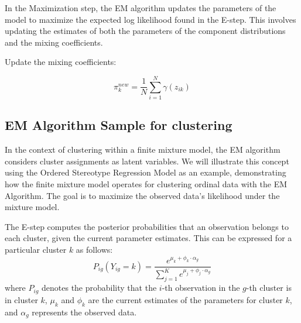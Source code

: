 \documentclass{article}
\begin{document}
In the Maximization step, the EM algorithm updates the parameters of the model to maximize the expected log likelihood found in the E-step. 
This involves updating the estimates of both the parameters of the component distributions and the mixing coefficients.

Update the mixing coefficients:

\begin{equation}
\pi_k^{new} = \frac{1}{N} \sum_{i=1}^{N} \gamma(z_{ik})
\end{equation}









\subsection{EM Algorithm Sample for clustering}
In the context of clustering within a finite mixture model, the EM algorithm considers cluster assignments as latent variables. 
We will illustrate this concept using the Ordered Stereotype Regression Model as an example, demonstrating how the finite mixture model operates for clustering ordinal data with the EM Algorithm. 
The goal is to maximize the observed data's likelihood under the mixture model.

The E-step computes the posterior probabilities that an observation belongs to each cluster, given the current parameter estimates. 
This can be expressed for a particular cluster \( k \) as follows:
\begin{equation}
P_{ig}(Y_{ig} = k) = \frac{e^{\mu_k + \phi_k \cdot \alpha_g}}{\sum_{j=1}^{K} e^{\mu_j + \phi_j \cdot \alpha_g}}
\end{equation}
where \( P_{ig} \) denotes the probability that the \( i \)-th observation in the \( g \)-th cluster is in cluster \( k \), \( \mu_k \) and \( \phi_k \) are the current estimates of the parameters for cluster \( k \), and \( \alpha_g \) represents the observed data.
\end{document}

